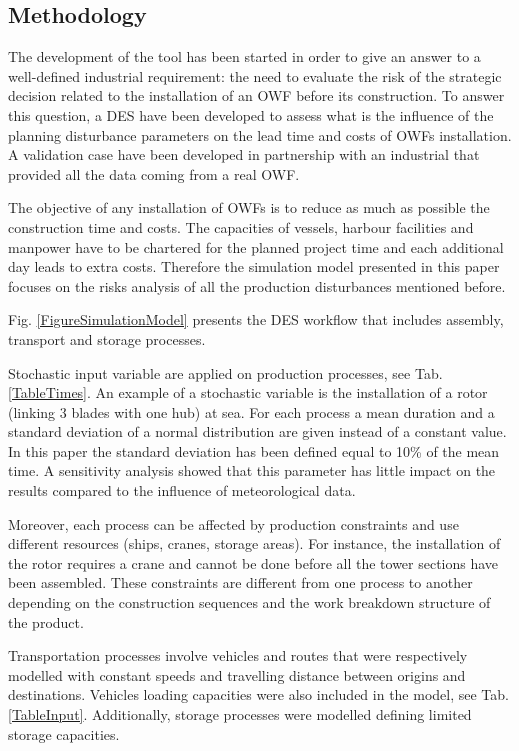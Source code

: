 \subsection{Methodology}
The development of the tool has been started in order to give an answer to a well-defined industrial requirement: the need to evaluate the risk of the strategic decision related to the installation of an OWF before its construction. To answer this question, a DES have been developed to assess what is the influence of the planning disturbance parameters on the lead time and costs of OWFs installation. A validation case have been developed in partnership with an industrial that provided all the data coming from a real OWF.

The objective of any installation of OWFs is to reduce as much as possible the construction time and costs. The capacities of vessels, harbour facilities and manpower have to be chartered for the planned project time and each additional day leads to extra costs. Therefore the simulation model presented in this paper focuses on the risks analysis of all the production disturbances mentioned before.

Fig. \ref{FigureSimulationModel} presents the DES workflow that includes assembly, transport and storage processes.

Stochastic input variable are applied on production processes, see Tab. \ref{TableTimes}. An example of a stochastic variable is the installation of a rotor (linking 3 blades with one hub) at sea. For each process a mean duration and a standard deviation of a normal distribution are given instead of a constant value. In this paper the standard deviation has been defined equal to 10\% of the mean time. A sensitivity analysis showed that this parameter has little impact on the results compared to the influence of meteorological data.

Moreover, each process can be affected by production constraints and use different resources (ships, cranes, storage areas). For instance, the installation of the rotor requires a crane and cannot be done before all the tower sections have been assembled. These constraints are different from one process to another depending on the construction sequences and the work breakdown structure of the product.

Transportation processes involve vehicles and routes that were respectively modelled with constant speeds and travelling distance between origins and destinations. Vehicles loading capacities were also included in the model, see Tab. \ref{TableInput}. Additionally, storage processes were modelled defining limited storage capacities.

